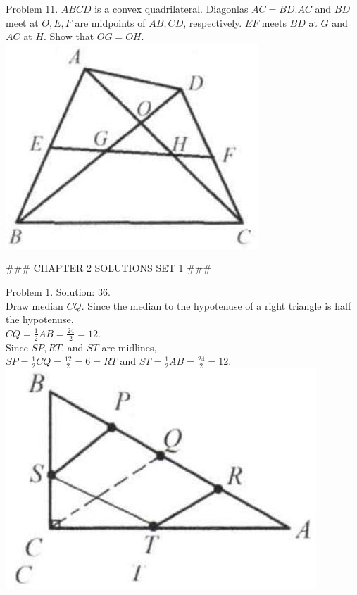 \documentclass[10pt]{article}
\begin{document}
Problem 11. \(A B C D\) is a convex quadrilateral. Diagonlas \(A C=B D . A C\) and \(B D\) meet at \(O, E, F\) are midpoints of \(A B, C D\), respectively. \(E F\) meets \(B D\) at \(G\) and \(A C\) at \(H\). Show that \(O G=O H\).\\
\includegraphics[max width=\textwidth, center]{2025_04_17_97bc1f7e44d93c271a88g-046}


### CHAPTER 2 SOLUTIONS SET 1 ###

Problem 1. Solution: 36.\\
Draw median \(C Q\). Since the median to the hypotenuse of a right triangle is half the hypotenuse,\\
\(C Q=\frac{1}{2} A B=\frac{24}{2}=12\).\\
Since \(S P, R T\), and \(S T\) are midlines,\\
\(S P=\frac{1}{2} C Q=\frac{12}{2}=6=R T\) and \(S T=\frac{1}{2} A B=\frac{24}{2}=12\).\\
\includegraphics[max width=\textwidth, center]{2025_04_17_97bc1f7e44d93c271a88g-047(2)}
\end{document}
